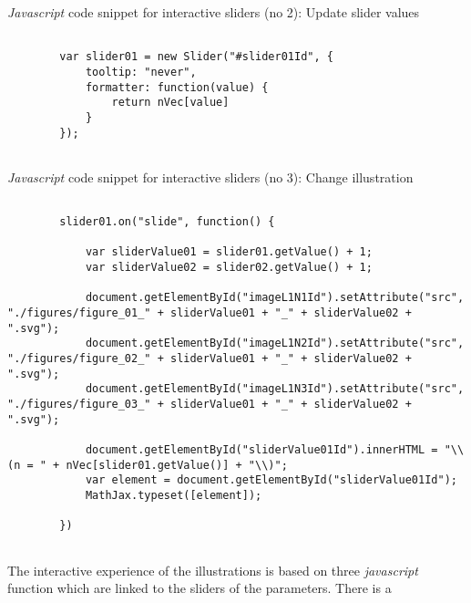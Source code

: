 \documentclass[12pt]{article}
\begin{document}
\begin{CodeSnippet}[!hp]
	\centering
	\caption{\emph{Javascript} code snippet for interactive sliders (no 2): Update slider values}
	\normalsize
	\vspace{0.25cm}
	\begin{BVerbatim}
						
		var slider01 = new Slider("#slider01Id", { 
			tooltip: "never",
			formatter: function(value) {
				return nVec[value]
			} 
		});
		
	\end{BVerbatim}
	\label{JsCodSniSliInt02}
\end{CodeSnippet}

\begin{CodeSnippet}[!hp]
	\centering
	\caption{\emph{Javascript} code snippet for interactive sliders (no 3): Change illustration}
	\tiny
	\vspace{0.25cm}
	\begin{BVerbatim}
		
		slider01.on("slide", function() {
			
			var sliderValue01 = slider01.getValue() + 1;
			var sliderValue02 = slider02.getValue() + 1;
			
			document.getElementById("imageL1N1Id").setAttribute("src", "./figures/figure_01_" + sliderValue01 + "_" + sliderValue02 + ".svg");
			document.getElementById("imageL1N2Id").setAttribute("src", "./figures/figure_02_" + sliderValue01 + "_" + sliderValue02 + ".svg");
			document.getElementById("imageL1N3Id").setAttribute("src", "./figures/figure_03_" + sliderValue01 + "_" + sliderValue02 + ".svg");
			
			document.getElementById("sliderValue01Id").innerHTML = "\\(n = " + nVec[slider01.getValue()] + "\\)";
			var element = document.getElementById("sliderValue01Id");
			MathJax.typeset([element]);
			
		})
		
	\end{BVerbatim}
	\label{JsCodSniSliInt03}
\end{CodeSnippet}

 





The interactive experience of the illustrations is based on three \emph{javascript} function which are linked to the sliders of the parameters. 
%
There is a 
\end{document}
